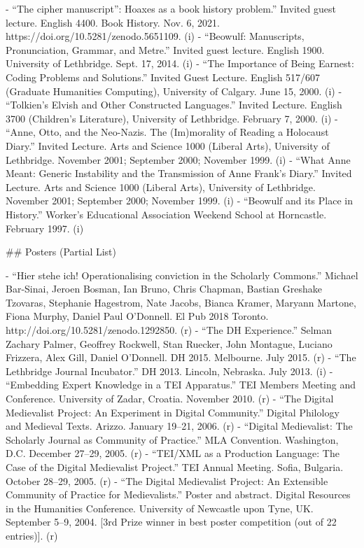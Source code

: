 - “The cipher manuscript”: Hoaxes as a book history problem.” Invited guest lecture. English 4400. Book History. Nov. 6, 2021. https:/\allowbreak{}/\allowbreak{}doi.org/\allowbreak{}10.5281/\allowbreak{}zenodo.5651109. (i)
- “Beowulf: Manuscripts, Pronunciation, Grammar, and Metre.” Invited guest lecture. English 1900. University of Lethbridge. Sept. 17, 2014. (i)
- “The Importance of Being Earnest: Coding Problems and Solutions.” Invited Guest Lecture. English 517/\allowbreak{}607 (Graduate Humanities Computing), University of Calgary. June 15, 2000. (i)
- “Tolkien’s Elvish and Other Constructed Languages.” Invited Lecture. English 3700 (Children’s Literature), University of Lethbridge. February 7, 2000. (i)
- “Anne, Otto, and the Neo-Nazis. The (Im)morality of Reading a Holocaust Diary.” Invited Lecture. Arts and Science 1000 (Liberal Arts), University of Lethbridge. November 2001; September 2000; November 1999. (i)
- “What Anne Meant: Generic Instability and the Transmission of Anne Frank’s Diary.” Invited Lecture. Arts and Science 1000 (Liberal Arts), University of Lethbridge. November 2001; September 2000; November 1999. (i)
- “Beowulf and its Place in History.” Worker’s Educational Association Weekend School at Horncastle. February 1997. (i)

\sectionbreak{}
## Posters (Partial List)

- “Hier stehe ich! Operationalising conviction in the Scholarly Commons.” Michael Bar-Sinai, Jeroen Bosman, Ian Bruno, Chris Chapman, Bastian Greshake Tzovaras, Stephanie Hagestrom, Nate Jacobs, Bianca Kramer, Maryann Martone, Fiona Murphy, Daniel Paul O’Donnell. El Pub 2018 Toronto. http:/\allowbreak{}/\allowbreak{}doi.org/\allowbreak{}10.5281/\allowbreak{}zenodo.1292850. (r)
- “The DH Experience.” Selman Zachary Palmer\*, Geoffrey Rockwell, Stan Ruecker, John Montague, Luciano Frizzera, Alex Gill, Daniel O’Donnell. DH 2015. Melbourne. July 2015. (r)
- “The Lethbridge Journal Incubator.” DH 2013. Lincoln, Nebraska. July 2013. (i)
- “Embedding Expert Knowledge in a TEI Apparatus.” TEI Members Meeting and Conference. University of Zadar, Croatia. November 2010. (r)
- “The Digital Medievalist Project: An Experiment in Digital Community.” Digital Philology and Medieval Texts. Arizzo. January 19–21, 2006. (r)
- “Digital Medievalist: The Scholarly Journal as Community of Practice.” MLA Convention. Washington, D.C. December 27–29, 2005. (r)
- “TEI/\allowbreak{}XML as a Production Language: The Case of the Digital Medievalist Project.” TEI Annual Meeting. Sofia, Bulgaria. October 28–29, 2005. (r)
- “The Digital Medievalist Project: An Extensible Community of Practice for Medievalists.” Poster and abstract. Digital Resources in the Humanities Conference. University of Newcastle upon Tyne, UK. September 5–9, 2004. [3rd Prize winner in best poster competition (out of 22 entries)]. (r)


